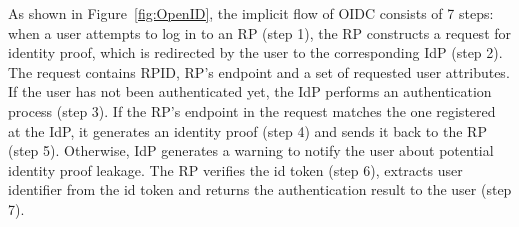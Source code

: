 As shown in Figure~\ref{fig:OpenID}, the implicit flow of OIDC consists of 7 steps: when a user attempts to log in to an RP (step 1), the RP constructs a request for identity proof, which is redirected by the user to the corresponding IdP (step 2). The request contains RPID, RP's endpoint and a set of requested user attributes. If the user has not been authenticated yet, the IdP performs an authentication process (step 3). If the RP's endpoint in the request matches the one registered at the IdP, it generates an identity proof (step 4) and sends it back to the RP (step 5). Otherwise, IdP generates a warning to notify the user about potential identity proof leakage. The RP verifies the id token (step 6), extracts user identifier from the id token and returns the authentication result to the user (step 7).

